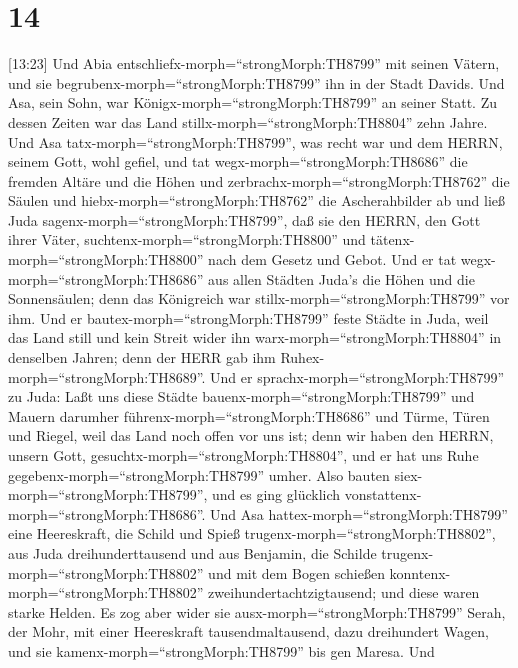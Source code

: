 \hypertarget{section-13}{%
\section{14}\label{section-13}}

 {[}13:23{]} Und Abia
entschliefx-morph=``strongMorph:TH8799'' mit seinen Vätern, und sie
begrubenx-morph=``strongMorph:TH8799'' ihn in der Stadt Davids. Und Asa,
sein Sohn, war Königx-morph=``strongMorph:TH8799'' an seiner Statt. Zu
dessen Zeiten war das Land stillx-morph=``strongMorph:TH8804'' zehn
Jahre.  Und Asa tatx-morph=``strongMorph:TH8799'', was recht
war und dem HERRN, seinem Gott, wohl gefiel,  und tat
wegx-morph=``strongMorph:TH8686'' die fremden Altäre und die Höhen und
zerbrachx-morph=``strongMorph:TH8762'' die Säulen und
hiebx-morph=``strongMorph:TH8762'' die Ascherahbilder ab 
und ließ Juda sagenx-morph=``strongMorph:TH8799'', daß sie den HERRN,
den Gott ihrer Väter, suchtenx-morph=``strongMorph:TH8800'' und
tätenx-morph=``strongMorph:TH8800'' nach dem Gesetz und Gebot.
 Und er tat wegx-morph=``strongMorph:TH8686'' aus allen
Städten Juda's die Höhen und die Sonnensäulen; denn das Königreich war
stillx-morph=``strongMorph:TH8799'' vor ihm.  Und er
bautex-morph=``strongMorph:TH8799'' feste Städte in Juda, weil das Land
still und kein Streit wider ihn warx-morph=``strongMorph:TH8804'' in
denselben Jahren; denn der HERR gab ihm
Ruhex-morph=``strongMorph:TH8689''.  Und er
sprachx-morph=``strongMorph:TH8799'' zu Juda: Laßt uns diese Städte
bauenx-morph=``strongMorph:TH8799'' und Mauern darumher
führenx-morph=``strongMorph:TH8686'' und Türme, Türen und Riegel, weil
das Land noch offen vor uns ist; denn wir haben den HERRN, unsern Gott,
gesuchtx-morph=``strongMorph:TH8804'', und er hat uns Ruhe
gegebenx-morph=``strongMorph:TH8799'' umher. Also bauten
siex-morph=``strongMorph:TH8799'', und es ging glücklich
vonstattenx-morph=``strongMorph:TH8686''.  Und Asa
hattex-morph=``strongMorph:TH8799'' eine Heereskraft, die Schild und
Spieß trugenx-morph=``strongMorph:TH8802'', aus Juda dreihunderttausend
und aus Benjamin, die Schilde trugenx-morph=``strongMorph:TH8802'' und
mit dem Bogen schießen konntenx-morph=``strongMorph:TH8802''
zweihundertachtzigtausend; und diese waren starke Helden. 
Es zog aber wider sie ausx-morph=``strongMorph:TH8799'' Serah, der Mohr,
mit einer Heereskraft tausendmaltausend, dazu dreihundert Wagen, und sie
kamenx-morph=``strongMorph:TH8799'' bis gen Maresa.  Und
